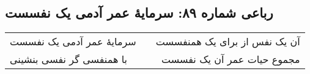 \begin{center}
\section*{رباعی شماره ۸۹: سرمایهٔ عمر آدمی یک نفسست}
\label{sec:sh089}
\begin{longtable}{l p{0.5cm} r}
سرمایهٔ عمر آدمی یک نفسست
&&
آن یک نفس از برای یک همنفسست
\\
با همنفسی گر نفسی بنشینی
&&
مجموع حیات عمر آن یک نفسست
\\
\end{longtable}
\end{center}

